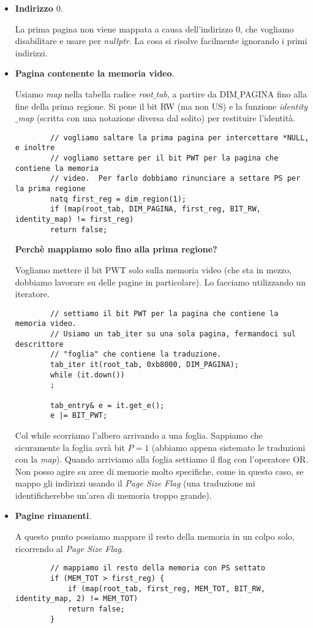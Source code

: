 \begin{itemize}
	\item \textbf{Indirizzo $0$}.
	
	La prima pagina non viene mappata a causa dell'indirizzo $0$, che vogliamo disabilitare e usare per \emph{nullptr}. La cosa si risolve facilmente ignorando i primi indirizzi.
	\item \textbf{Pagina contenente la memoria video}.
	
	Usiamo \emph{map} nella tabella radice \emph{root$\_$tab}, a partire da DIM$\_$PAGINA fino alla fine della prima regione. Si pone il bit RW (ma non US) e la funzione \emph{identity$\_$map} (scritta con una notazione diversa dal solito) per restituire l'identità.
	\begin{verbatim}
		// vogliamo saltare la prima pagina per intercettare *NULL, e inoltre
		// vogliamo settare per il bit PWT per la pagina che contiene la memoria
		// video.  Per farlo dobbiamo rinunciare a settare PS per la prima regione
		natq first_reg = dim_region(1);
		if (map(root_tab, DIM_PAGINA, first_reg, BIT_RW, identity_map) != first_reg)
		return false;
	\end{verbatim}
	\textbf{Perchè mappiamo solo fino alla prima regione? }
	
	Vogliamo mettere il bit PWT  solo sulla memoria video (che sta in mezzo, dobbiamo lavorare su delle pagine in particolare). Lo facciamo utilizzando un iteratore.
	\begin{verbatim}
		// settiamo il bit PWT per la pagina che contiene la memoria video.
		// Usiamo un tab_iter su una sola pagina, fermandoci sul descrittore
		// "foglia" che contiene la traduzione.
		tab_iter it(root_tab, 0xb8000, DIM_PAGINA);
		while (it.down())
		;
		
		tab_entry& e = it.get_e();
		e |= BIT_PWT;
	\end{verbatim}
	Col while scorriamo l'albero arrivando a una foglia. Sappiamo che sicuramente la foglia avrà bit $P=1$ (abbiamo appena sistemato le traduzioni con la \emph{map}). Quando arriviamo alla foglia settiamo il flag con l'operatore OR. Non posso agire su aree di memorie molto specifiche, come in questo caso, se mappo gli indirizzi usando il \emph{Page Size Flag} (una traduzione mi identificherebbe un'area di memoria troppo grande).
	
	\item \textbf{Pagine rimanenti}. 
	
	A questo punto possiamo mappare il resto della memoria in un colpo solo, ricorrendo al \emph{Page Size Flag}.
	\begin{verbatim}
		// mappiamo il resto della memoria con PS settato
		if (MEM_TOT > first_reg) {
			if (map(root_tab, first_reg, MEM_TOT, BIT_RW, identity_map, 2) != MEM_TOT)
			return false;
		}
	\end{verbatim}
	

\end{itemize}
